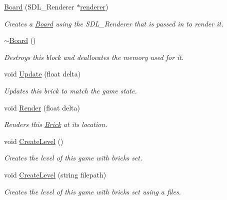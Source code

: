 \begin{DoxyCompactItemize}
\item 
\mbox{\label{classBoard_a04c486ebbe8171dfa7fbc6dbd3bdb32d}} 
\hyperlink{classBoard_a04c486ebbe8171dfa7fbc6dbd3bdb32d}{Board} (S\+D\+L\+\_\+\+Renderer $\ast$\hyperlink{classEntity_a2747dfdd9fa4fe743c8b80450bc99dbd}{renderer})
\begin{DoxyCompactList}\small\item\em Creates a \hyperlink{classBoard}{Board} using the S\+D\+L\+\_\+\+Renderer that is passed in to render it. \end{DoxyCompactList}\item 
\mbox{\label{classBoard_af73f45730119a1fd8f6670f53f959e68}} 
\hyperlink{classBoard_af73f45730119a1fd8f6670f53f959e68}{$\sim$\+Board} ()
\begin{DoxyCompactList}\small\item\em Destroys this block and deallocates the memory used for it. \end{DoxyCompactList}\item 
\mbox{\label{classBoard_aa1fb89db8206ace3f973f2f911af4125}} 
void \hyperlink{classBoard_aa1fb89db8206ace3f973f2f911af4125}{Update} (float delta)
\begin{DoxyCompactList}\small\item\em Updates this brick to match the game state. \end{DoxyCompactList}\item 
\mbox{\label{classBoard_a2cdb83c07225dd83366ce10ea2978dd8}} 
void \hyperlink{classBoard_a2cdb83c07225dd83366ce10ea2978dd8}{Render} (float delta)
\begin{DoxyCompactList}\small\item\em Renders this \hyperlink{classBrick}{Brick} at its location. \end{DoxyCompactList}\item 
\mbox{\label{classBoard_af11cf454515ef90de6c659a79bcbac00}} 
void \hyperlink{classBoard_af11cf454515ef90de6c659a79bcbac00}{Create\+Level} ()
\begin{DoxyCompactList}\small\item\em Creates the level of this game with bricks set. \end{DoxyCompactList}\item 
void \hyperlink{classBoard_a5238b7d770a9b834b8eff70af43c58b7}{Create\+Level} (string filepath)
\begin{DoxyCompactList}\small\item\em Creates the level of this game with bricks set using a files. \end{DoxyCompactList}\end{DoxyCompactItemize}
